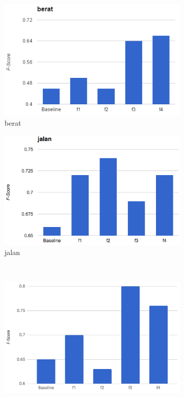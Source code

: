 \begin{figure}[H]
	\ContinuedFloat
	\begin{subfigure}{.5\textwidth}
		\centering
		\includegraphics[width=1\linewidth]{adit_pics/berat.png}
		\caption{berat}
	\end{subfigure}%
	\begin{subfigure}{.5\textwidth}
		\centering
		\includegraphics[width=1\linewidth]{adit_pics/jalan.png}
		\caption{jalan}
	\end{subfigure}%
	\\
	\begin{subfigure}{.5\textwidth}
		\centering
		\includegraphics[width=1\linewidth]{adit_pics/alam.png}

\end{subfigure}
\end{figure}
